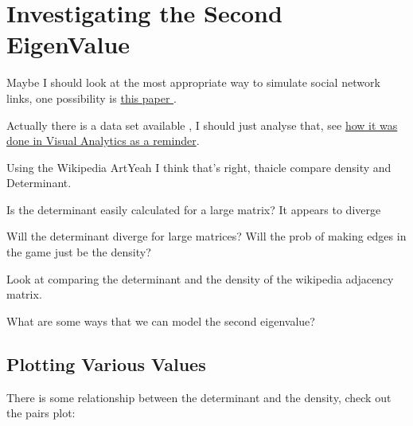\documentclass[11pt]{article}
\begin{document}
\section{Investigating the Second EigenValue}
\label{sec:org6aa239e}

Maybe I should look at the most appropriate way to simulate social network links, one possibility is \href{https://crpit.scem.westernsydney.edu.au/confpapers/CRPITV144Zeng.pdf}{this paper } \cite{zengPracticalSimulationMethod2013}.

Actually there is a data set available
 \cite{garritanoWikipediaArticleNetworks2019}, I should just analyse that, see \href{file:///home/ryan/Dropbox/DataSci/Visual\_Analytics/Assessment/the-marvel-universe-social-network/plotly3d\_Marvel.r}{how
it was done in Visual Analytics as a reminder}.

Using the Wikipedia ArtYeah I think that's right, thaicle compare density and Determinant.

Is the determinant easily calculated for a large matrix?
  It appears to diverge

Will the determinant diverge for large matrices?
Will the prob of making edges in the game just be the density?

Look at comparing the determinant and the density of the wikipedia adjacency matrix.

What are some ways that we can model the second eigenvalue?

\subsection{Plotting Various Values}
\label{sec:org7fd8f04}

There is some relationship between the determinant and the density, check out the pairs plot:
\end{document}
